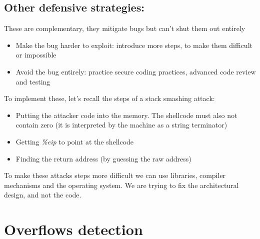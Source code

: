 \documentclass[11pt, oneside]{article}   	%
\begin{document}
\subsection*{Other defensive strategies:}
These are complementary, they mitigate bugs but can't shut them out entirely
\begin{itemize}
\item Make the bug harder to exploit: introduce more steps, to make them difficult or impossible
\item Avoid the bug entirely: practice secure coding practices, advanced code review and testing
\end{itemize}
To implement these, let's recall the steps of a stack smashing attack:
\begin{itemize}
\item Putting the attacker code into the memory. The shellcode must also not contain zero (it is interpreted by the machine as a string terminator)
\item Getting \emph{\%eip} to point at the shellcode
\item Finding the return address (by guessing the raw address)
\end{itemize}
To make these attacks steps more difficult we can use libraries, compiler mechanisms and the operating system. We are trying to fix the architectural design, and not the code.

\section*{Overflows detection}
\end{document}
